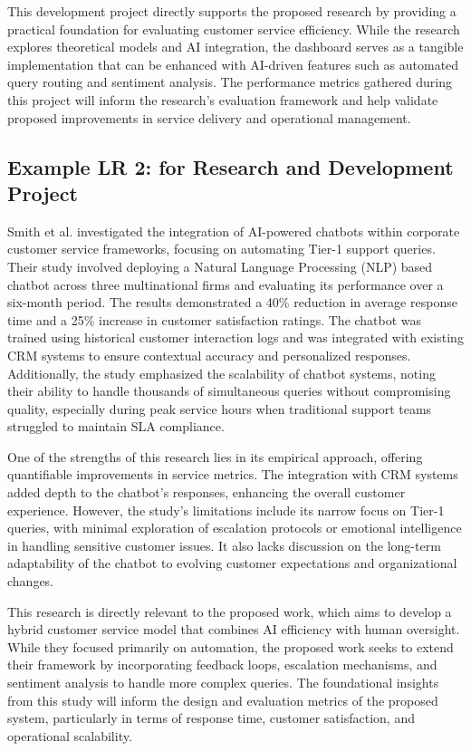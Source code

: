 \documentclass{FastFyp}
\begin{document}
This development project directly supports the proposed research by providing a practical foundation for evaluating customer service efficiency. While the research explores theoretical models and AI integration, the dashboard serves as a tangible implementation that can be enhanced with AI-driven features such as automated query routing and sentiment analysis. The performance metrics gathered during this project will inform the research’s evaluation framework and help validate proposed improvements in service delivery and operational management.

 \subsection{Example LR 2: for Research and Development Project}
Smith et al. \cite{ref:Bishop:2006} investigated the integration of AI-powered chatbots within corporate customer service frameworks, focusing on automating Tier-1 support queries. Their study involved deploying a Natural Language Processing (NLP) based chatbot across three multinational firms and evaluating its performance over a six-month period. The results demonstrated a 40\% reduction in average response time and a 25\% increase in customer satisfaction ratings. The chatbot was trained using historical customer interaction logs and was integrated with existing CRM systems to ensure contextual accuracy and personalized responses. Additionally, the study emphasized the scalability of chatbot systems, noting their ability to handle thousands of simultaneous queries without compromising quality, especially during peak service hours when traditional support teams struggled to maintain SLA compliance.

One of the strengths of this research lies in its empirical approach, offering quantifiable improvements in service metrics. The integration with CRM systems added depth to the chatbot’s responses, enhancing the overall customer experience. However, the study’s limitations include its narrow focus on Tier-1 queries, with minimal exploration of escalation protocols or emotional intelligence in handling sensitive customer issues. It also lacks discussion on the long-term adaptability of the chatbot to evolving customer expectations and organizational changes.

This research is directly relevant to the proposed work, which aims to develop a hybrid customer service model that combines AI efficiency with human oversight. While they focused primarily on automation, the proposed work seeks to extend their framework by incorporating feedback loops, escalation mechanisms, and sentiment analysis to handle more complex queries. The foundational insights from this study will inform the design and evaluation metrics of the proposed system, particularly in terms of response time, customer satisfaction, and operational scalability.
\end{document}
